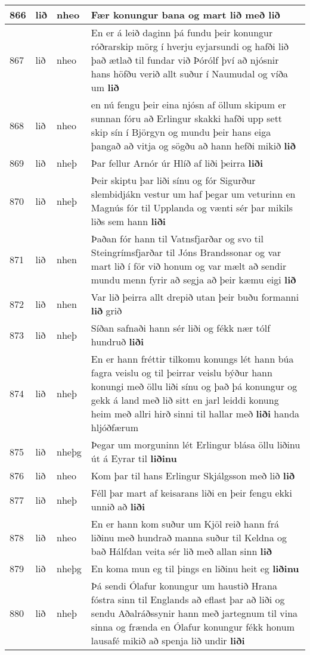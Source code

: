 \documentclass{article}
\begin{document}
\begin{longtable}{p{1cm}|p{1cm}|p{1cm}|p{13cm}}
\hline
866&lið&nheo&Fær konungur bana og mart lið með \textbf{lið} \\
\hline
867&lið&nheo&En er á leið daginn þá fundu þeir konungur róðrarskip mörg í hverju eyjarsundi og hafði lið það ætlað til fundar við Þórólf því að njósnir hans höfðu verið allt suður í Naumudal og víða um \textbf{lið} \\
\hline
868&lið&nheo&en nú fengu þeir eina njósn af öllum skipum er sunnan fóru að Erlingur skakki hafði upp sett skip sín í Björgyn og mundu þeir hans eiga þangað að vitja og sögðu að hann hefði mikið \textbf{lið} \\
\hline
869&lið&nheþ&Þar fellur Arnór úr Hlíð af liði þeirra \textbf{liði} \\
\hline
870&lið&nheþ&Þeir skiptu þar liði sínu og fór Sigurður slembidjákn vestur um haf þegar um veturinn en Magnús fór til Upplanda og vænti sér þar mikils liðs sem hann \textbf{liði} \\
\hline
871&lið&nhen&Þaðan fór hann til Vatnsfjarðar og svo til Steingrímsfjarðar til Jóns Brandssonar og var mart lið í för við honum og var mælt að sendir mundu menn fyrir að segja að þeir kæmu eigi \textbf{lið} \\
\hline
872&lið&nhen&Var lið þeirra allt drepið utan þeir buðu formanni \textbf{lið} grið\\
\hline
873&lið&nheþ&Síðan safnaði hann sér liði og fékk nær tólf hundruð \textbf{liði} \\
\hline
874&lið&nheþ&En er hann fréttir tilkomu konungs lét hann búa fagra veislu og til þeirrar veislu býður hann konungi með öllu liði sínu og það þá konungur og gekk á land með lið sitt en jarl leiddi konung heim með allri hirð sinni til hallar með \textbf{liði} handa hljóðfærum\\
\hline
875&lið&nheþg&Þegar um morguninn lét Erlingur blása öllu liðinu út á Eyrar til \textbf{liðinu} \\
\hline
876&lið&nheo&Kom þar til hans Erlingur Skjálgsson með lið \textbf{lið} \\
\hline
877&lið&nheþ&Féll þar mart af keisarans liði en þeir fengu ekki unnið að \textbf{liði} \\
\hline
878&lið&nheo&En er hann kom suður um Kjöl reið hann frá liðinu með hundrað manna suður til Keldna og bað Hálfdan veita sér lið með allan sinn \textbf{lið} \\
\hline
879&lið&nheþg&En koma mun eg til þings en liðinu heit eg \textbf{liðinu} \\
\hline
880&lið&nheþ&Þá sendi Ólafur konungur um haustið Hrana fóstra sinn til Englands að eflast þar að liði og sendu Aðalráðssynir hann með jartegnum til vina sinna og frænda en Ólafur konungur fékk honum lausafé mikið að spenja lið undir \textbf{liði} \\

\end{longtable}
\end{document}
